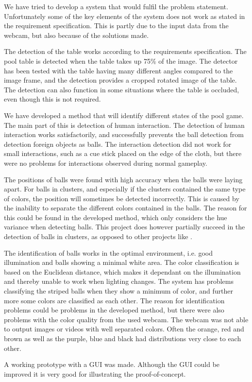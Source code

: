 
We have tried to develop a system that would fulfil the problem statement. Unfortunately some of the key elements of the system does not work as stated in the requirement specification. This is partly due to the input data from the webcam, but also because of the solutions made.

The detection of the table works according to the requirements specification. The pool table is detected when the table takes up 75\% of the image. The detector has been tested with the table having many different angles compared to the image frame, and the detection provides a cropped rotated image of the table. The detection can also function in some situations where the table is occluded, even though this is not required.

We have developed a method that will identify different states of the pool game. The main part of this is detection of human interaction. The detection of human interaction works satisfactorily, and successfully prevents the ball detection from detection foreign objects as balls. The interaction detection did not work for small interactions, such as a cue stick placed on the edge of the cloth, but there were no problems for interactions observed during normal gameplay.

The positions of balls were found with high accuracy when the balls were laying apart. For balls in clusters, and especially if the clusters contained the same type of colors, the position will sometimes be detected incorrectly. This is caused by the inability to separate the different colors contained in the balls. The reason for this could be found in the developed method, which only considers the hue variance when detecting balls. This project does however partially succeed in the detection of balls in clusters, as opposed to other projects like \cite{supportBilliard}.

The identification of balls works in the optimal environment, i.e. good illumination and balls showing a minimal white area. The color classification is based on the Euclidean distance, which makes it dependant on the illumination and thereby unable to work when lighting changes.
The system has problems classifying the striped balls when they show a minimum of color, and further more some colors are classified as each other. The reason for identification problems could be problems in the developed method, but there were also problems with the color quality from the used webcam. The webcam was not able to output images or videos with well separated colors. Often the orange, red and brown as well as the purple, blue and black had distributions very close to each other.

A working prototype with a GUI was made. Although the GUI could be improved it is very good for illustrating the proof-of-concept.